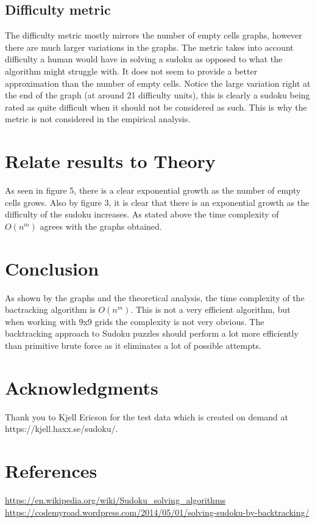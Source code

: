 \documentclass{article}
\begin{document}
\newpage

\subsection{Difficulty metric}
The difficulty metric mostly mirrors the number of empty cells graphs, however there are much larger variations in the graphs. The metric takes into account difficulty a human would have in solving a sudoku as opposed to what the algorithm might struggle with. It does not seem to provide a better approximation than the number of empty cells. Notice the large variation right at the end of the graph (at around 21 difficulty units), this is clearly a sudoku being rated as quite difficult when it should not be considered as such. This is why the metric is not considered in the empirical analysis.

\section{Relate results to Theory}
As seen in figure 5, there is a clear exponential growth as the number of empty cells grows. Also by figure 3, it is clear that there is an exponential growth as the difficulty of the sudoku increases. As stated above the time complexity of $O(n^m)$ agrees with the graphs obtained.

\section{Conclusion}
As shown by the graphs and the theoretical analysis, the time complexity of the bactracking algorithm is $O(n^m)$. This is not a very efficient algorithm, but when working with 9x9 grids the complexity is not very obvious. The backtracking approach to Sudoku puzzles should perform a lot more efficiently than primitive brute force as it eliminates a lot of possible attempts.

\section{Acknowledgments}
Thank you to Kjell Ericson for the test data which is created on demand at https://kjell.haxx.se/sudoku/.

\section{References}
\url{https://en.wikipedia.org/wiki/Sudoku_solving_algorithms} \\
\url{https://codemyroad.wordpress.com/2014/05/01/solving-sudoku-by-backtracking/}
\end{document}
